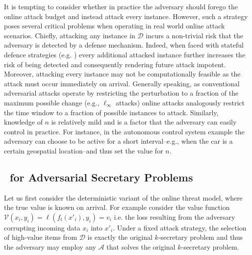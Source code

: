  It is tempting to consider whether in practice the adversary should forego the online attack budget and instead attack every instance. However, such a strategy poses several critical problems when operating in real world online attack scenarios. Chiefly, attacking any instance in $\mathcal{D}$ incurs a non-trivial risk that the adversary is detected by a defense mechanism. Indeed, when faced with stateful defence strategies (e.g. \cite{chen2020stateful}) every additional attacked instance further increases the risk of being detected and consequently rendering future attack impotent. Moreover, attacking every instance may not be computationally feasible as the attack must occur immediately on arrival. Generally speaking, as conventional adversarial attacks operate by restricting the perturbation to a fraction of the maximum possible change (e.g., $\ell_{\infty}$ attacks) online attacks analogously restrict the time window to a fraction of possible instances to attack. Similarly, knowledge of $n$ is relatively mild and is a factor that the adversary can easily control in practice. For instance, in the autonomous control system example the adversary can choose to be active for a short interval--e.g., when the car is a certain geospatial location--and thus set the value for $n$.

\subsection{\algoname\ for Adversarial Secretary Problems}
\label{virtual_plus}
Let us first consider the deterministic variant of the online threat model, where the true value is known on arrival. For example consider the value function $\mathcal{V}(x_i,y_i) = \ell(f_{t}(x'_i),y_i) = v_i$ i.e. the loss resulting from the adversary corrupting incoming data $x_i$ into $x'_i$. Under a fixed attack strategy, the selection of high-value items from $\mathcal{D}$ is exactly the original $k$-secretary problem and thus the adversary may employ any $\mathcal{A}$ that solves the original $k$-secretary problem.



